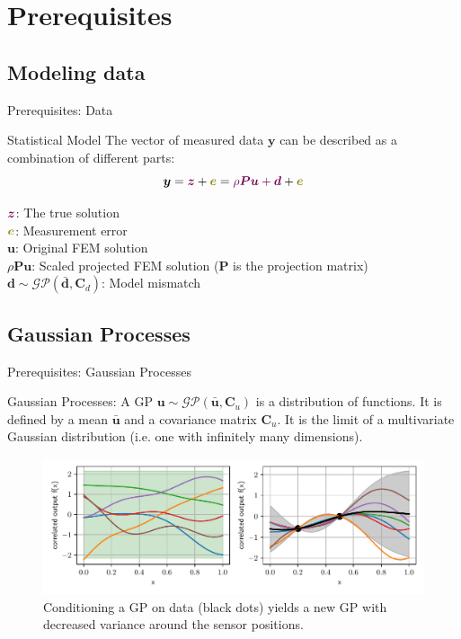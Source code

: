 \documentclass[fleqn,11pt,aspectratio=43]{beamer}
\begin{document}
\section{Prerequisites}


\subsection{Modeling data}
\begin{frame}{Prerequisites: Data}

\begin{block}{Statistical Model}
The vector of measured data $\bm{y}$ can be described as a combination of different parts:
\begin{equation*}
\bm{y} = \textcolor{DGTU}{\bm{z}} + \textcolor{olive}{\bm{e}} = \textcolor{DGTU}{\rho \bm{P} \bm{u} + \bm{d}} + \textcolor{olive}{\bm{e}}
\end{equation*}
\end{block}
$\textcolor{DGTU}{\bm{z}}$: The true solution\\
$\textcolor{olive}{\bm{e}}$: Measurement error\\
$\bm{u}$: Original FEM solution\\
$\rho \bm{P} \bm{u}$: Scaled projected FEM solution ($\bm{P}$ is the projection matrix)\\

$\bm{d} \sim \mathcal{GP}(\bar{\bm{d}}, \bm{C}_d)$: Model mismatch
\end{frame}


\subsection{Gaussian Processes}
\begin{frame}{Prerequisites: Gaussian Processes}
\begin{block}{Gaussian Processes:}
A GP $\bm{u} \sim \mathcal{GP}(\bar{\bm{u}},\bm{C}_u)$ is a distribution of functions. It is defined by a mean $\bar{\bm{u}}$ and a covariance matrix $\bm{C}_u$. It is the limit of a multivariate Gaussian distribution (i.e. one with infinitely many dimensions).

\end{block}
      	\begin{figure}[h]
		\begin{center}
		\includegraphics[width=.9\textwidth]{GPExpl.pdf}
		\end{center}
		\caption{Conditioning a GP on data (black dots) yields a new GP with decreased variance around the sensor positions.}
		\end{figure}

\end{frame}
\end{document}
